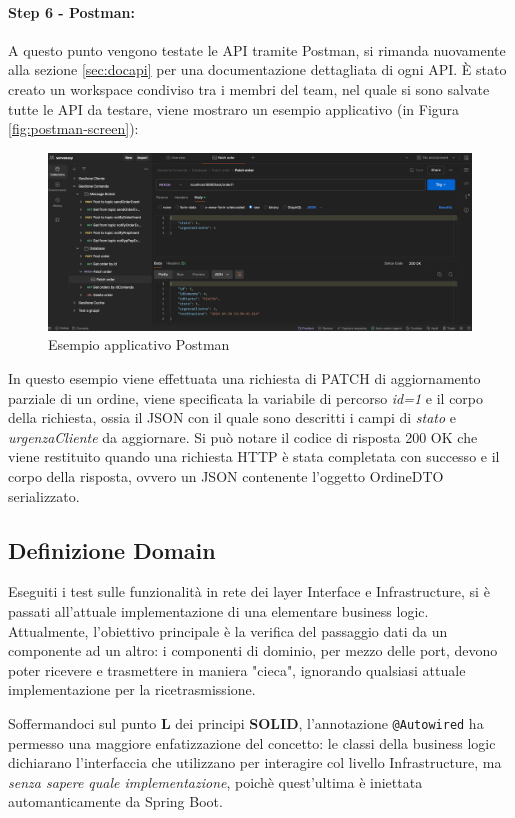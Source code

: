 \paragraph{Step 6 - Postman:}
A questo punto vengono testate le API tramite Postman, si rimanda nuovamente alla sezione \vref{sec:docapi} per una documentazione dettagliata di ogni API.
È stato creato un workspace condiviso tra i membri del team, nel quale si sono salvate tutte le API da testare, viene mostraro un esempio applicativo (in Figura \vref{fig:postman-screen}):
\begin{figure}[H]
    \centering
    \includegraphics[width=1\linewidth]{iterazione1/images/postman-screen.png}
    \caption{Esempio applicativo Postman}
    \label{fig:postman-screen}
\end{figure}
In questo esempio viene effettuata una richiesta di PATCH di aggiornamento parziale di un ordine, viene specificata la variabile di percorso \textit{id=1} e il corpo della richiesta, ossia il JSON con il quale sono descritti i campi di \textit{stato} e \textit{urgenzaCliente} da aggiornare. Si può notare il codice di risposta 200 OK che viene restituito quando una richiesta HTTP è stata completata con successo e il corpo della risposta, ovvero un JSON contenente l'oggetto OrdineDTO serializzato.


\subsection{Definizione Domain}
Eseguiti i test sulle funzionalità in rete dei layer Interface e Infrastructure, si è passati all'attuale implementazione di una elementare business logic. Attualmente, l'obiettivo principale è la verifica del passaggio dati da un componente ad un altro: i componenti di dominio, per mezzo delle port, devono poter ricevere e trasmettere in maniera "cieca", ignorando qualsiasi attuale implementazione per la ricetrasmissione. 

Soffermandoci sul punto \textbf{L} dei principi \textbf{SOLID}, l'annotazione \texttt{@Autowired} ha permesso una maggiore enfatizzazione del concetto: le classi della business logic dichiarano l'interfaccia che utilizzano per interagire col livello Infrastructure, ma \textit{senza sapere quale implementazione}, poichè quest'ultima è iniettata automanticamente da Spring Boot.

